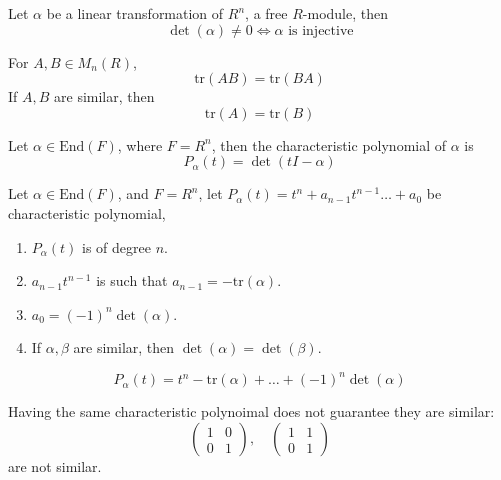 \documentclass[openany]{book}
\newcommand{\tr}{\text{tr}}
\begin{document}
\begin{prop}
    Let $\alpha$ be a linear transformation of $R^n$, a free $R$-module, then 
    \begin{equation*}
        \det(\alpha)\neq 0\iff \alpha\text{ is injective}
    \end{equation*}
\end{prop}
\begin{prop}
    For $A,B\in M_n(R)$, 
    \begin{equation*}
        \tr(AB)=\tr(BA)
    \end{equation*}
    If $A,B$ are similar, then 
    \begin{equation*}
        \tr(A)=\tr(B)
    \end{equation*}
\end{prop}

\begin{defn}
    Let $\alpha\in\text{End}(F)$, where $F=R^n$, then the characteristic polynomial of $\alpha$ is 
    \begin{equation*}
        P_\alpha(t)=\det(tI-\alpha)
    \end{equation*} 
\end{defn}

\begin{prop}
    Let $\alpha\in\text{End}(F)$, and $F=R^n$, let $P_\alpha(t)=t^n+a_{n-1}t^{n-1}\dots+a_0$ be characteristic polynomial,
    \begin{enumerate}
        \item $P_\alpha(t)$ is of degree $n$.
        \item $a_{n-1}t^{n-1}$ is such that $a_{n-1}=-\tr(\alpha)$.
        \item $a_0=(-1)^n\det(\alpha)$.
        \item If $\alpha,\beta$ are similar, then $\det(\alpha)=\det(\beta)$. 
    \end{enumerate}
    \begin{equation*}
        P_\alpha(t)=t^n-\tr(\alpha)+\dots+(-1)^n\det(\alpha)
    \end{equation*}
\end{prop}

\begin{example}
    Having the same characteristic polynoimal does not guarantee they are similar:
    \begin{equation*}
        \begin{pmatrix}
            1&0\\
            0&1
        \end{pmatrix}, \quad 
        \begin{pmatrix}
            1&1\\
            0&1
        \end{pmatrix}
    \end{equation*}
    are not similar.
\end{example}
\end{document}
